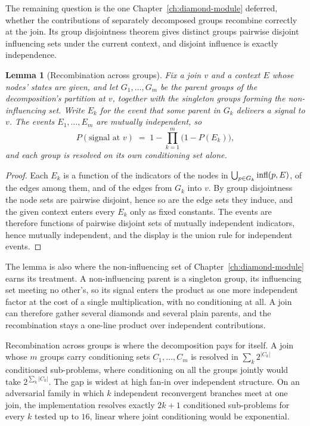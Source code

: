 \documentclass[12pt]{report}
\newtheorem{lemma}[theorem]{Lemma}
\begin{document}
The remaining question is the one Chapter~\ref{ch:diamond-module} deferred, whether the contributions of separately decomposed groups recombine correctly at the join. Its group disjointness theorem gives distinct groups pairwise disjoint influencing sets under the current context, and disjoint influence is exactly independence.

\begin{lemma}[Recombination across groups]
\label{lem:pp-recombination}
Fix a join $v$ and a context $E$ whose nodes' states are given, and let $G_1, \dots, G_m$ be the parent groups of the decomposition's partition at $v$, together with the singleton groups forming the non-influencing set. Write $E_k$ for the event that some parent in $G_k$ delivers a signal to $v$. The events $E_1, \dots, E_m$ are mutually independent, so
\[
P(\text{signal at } v) \;=\; 1 - \prod_{k=1}^{m} \bigl( 1 - P(E_k) \bigr),
\]
and each group is resolved on its own conditioning set alone.
\end{lemma}

\begin{proof}
Each $E_k$ is a function of the indicators of the nodes in $\bigcup_{p \in G_k} \mathrm{infl}(p, E)$, of the edges among them, and of the edges from $G_k$ into $v$. By group disjointness the node sets are pairwise disjoint, hence so are the edge sets they induce, and the given context enters every $E_k$ only as fixed constants. The events are therefore functions of pairwise disjoint sets of mutually independent indicators, hence mutually independent, and the display is the union rule for independent events.
\end{proof}

The lemma is also where the non-influencing set of Chapter~\ref{ch:diamond-module} earns its treatment. A non-influencing parent is a singleton group, its influencing set meeting no other's, so its signal enters the product as one more independent factor at the cost of a single multiplication, with no conditioning at all. A join can therefore gather several diamonds and several plain parents, and the recombination stays a one-line product over independent contributions.

Recombination across groups is where the decomposition pays for itself. A join whose $m$ groups carry conditioning sets $C_1, \dots, C_m$ is resolved in $\sum_k 2^{|C_k|}$ conditioned sub-problems, where conditioning on all the groups jointly would take $2^{\sum_k |C_k|}$. The gap is widest at high fan-in over independent structure. On an adversarial family in which $k$ independent reconvergent branches meet at one join, the implementation resolves exactly $2k + 1$ conditioned sub-problems for every $k$ tested up to $16$, linear where joint conditioning would be exponential.
\end{document}
